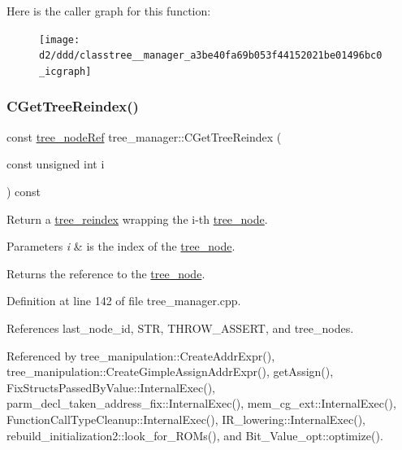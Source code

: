 Here is the caller graph for this function\+:
\nopagebreak
\begin{figure}[H]
\begin{center}
\leavevmode
\texttt{[image: d2/ddd/classtree\_\_manager\_a3be40fa69b053f44152021be01496bc0\_icgraph]}
\end{center}
\end{figure}
\mbox{\label{classtree__manager_a845dc23e54477b4c7dac3c874619ff60}} 
\subsubsection{\texorpdfstring{C\+Get\+Tree\+Reindex()}{CGetTreeReindex()}}
{\footnotesize\ttfamily const \hyperlink{tree__node_8hpp_a6ee377554d1c4871ad66a337eaa67fd5}{tree\+\_\+node\+Ref} tree\+\_\+manager\+::\+C\+Get\+Tree\+Reindex (\begin{DoxyParamCaption}\item[{const unsigned int}]{i }\end{DoxyParamCaption}) const}



Return a \hyperlink{classtree__reindex}{tree\+\_\+reindex} wrapping the i-\/th \hyperlink{classtree__node}{tree\+\_\+node}. 


\begin{DoxyParams}{Parameters}
{\em i} & is the index of the \hyperlink{classtree__node}{tree\+\_\+node}. \\
\hline
\end{DoxyParams}
\begin{DoxyReturn}{Returns}
the reference to the \hyperlink{classtree__node}{tree\+\_\+node}. 
\end{DoxyReturn}


Definition at line 142 of file tree\+\_\+manager.\+cpp.



References last\+\_\+node\+\_\+id, S\+TR, T\+H\+R\+O\+W\+\_\+\+A\+S\+S\+E\+RT, and tree\+\_\+nodes.



Referenced by tree\+\_\+manipulation\+::\+Create\+Addr\+Expr(), tree\+\_\+manipulation\+::\+Create\+Gimple\+Assign\+Addr\+Expr(), get\+Assign(), Fix\+Structs\+Passed\+By\+Value\+::\+Internal\+Exec(), parm\+\_\+decl\+\_\+taken\+\_\+address\+\_\+fix\+::\+Internal\+Exec(), mem\+\_\+cg\+\_\+ext\+::\+Internal\+Exec(), Function\+Call\+Type\+Cleanup\+::\+Internal\+Exec(), I\+R\+\_\+lowering\+::\+Internal\+Exec(), rebuild\+\_\+initialization2\+::look\+\_\+for\+\_\+\+R\+O\+Ms(), and Bit\+\_\+\+Value\+\_\+opt\+::optimize().

